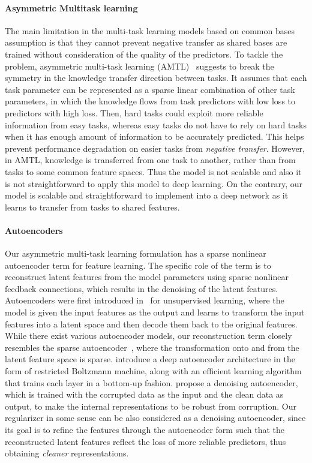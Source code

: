 \documentclass{article}
\begin{document}
	\paragraph{Asymmetric Multitask learning}
	The main limitation in the multi-task learning models based on common bases assumption is that they cannot prevent negative transfer as shared bases are trained without consideration of the quality of the predictors. To tackle the problem, asymmetric multi-task learning (AMTL)~\cite{amtl} suggests to break the symmetry in the knowledge transfer direction between tasks. It assumes that each task parameter can be represented as a sparse linear combination of other task parameters, in which the knowledge flows from task predictors with low loss to predictors with high loss. Then, hard tasks could exploit more reliable information from easy tasks, whereas easy tasks do not have to rely on hard tasks when it has enough amount of information to be accurately predicted. This helps prevent performance degradation on easier tasks from \emph{negative transfer}. However, in AMTL, knowledge is transferred from one task to another, rather than from tasks to some common feature spaces. Thus the model is not scalable and also it is not straightforward to apply this model to deep learning. On the contrary, our model is scalable and straightforward to implement into a deep network as it learns to transfer from tasks to shared features.
	
	\paragraph{Autoencoders}
	Our asymmetric multi-task learning formulation has a sparse nonlinear autoencoder term for feature learning. The specific role of the term is to reconstruct latent features from the model parameters using sparse nonlinear feedback connections, which results in the denoising of the latent features. Autoencoders were first introduced in~\cite{autoencoder} for unsupervised learning, where the model is given the input features as the output and learns to transform the input features into a latent space and then decode them back to the original features. While there exist various autoencoder models, our reconstruction term closely resembles the sparse autoencoder~\cite{ranzato07}, where the transformation onto and from the latent feature space is sparse. \cite{hinton2006science} introduce a deep autoencoder architecture in the form of restricted Boltzmann machine, along with an efficient learning algorithm that trains each layer in a bottom-up fashion. \cite{dae} propose a denoising autoencoder, which is trained with the corrupted data as the input and the clean data as output, to make the internal representations to be robust from corruption. Our regularizer in some sense can be also considered as a denoising autoencoder, since its goal is to refine the features through the autoencoder form such that the reconstructed latent features reflect the loss of more reliable predictors, thus obtaining \emph{cleaner} representations.
	
\end{document}
